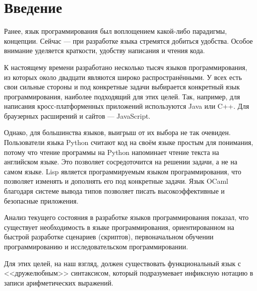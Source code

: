 \section*{Введение}
    Ранее, язык программирования был воплощением какой-либо парадигмы, концепции.
    Сейчас --- при разработке языка стремятся добиться удобства.
    Особое внимание уделяется краткости, удобству написания и чтения кода.

    К настоящему времени разработано несколько тысяч языков программирования, из которых около двадцати являются широко распространёнными\cite{TIOBE}.
    У всех есть свои сильные стороны и под конкретные задачи выбирается конкретный язык программирования, наиболее подходящий для этих целей.
    Так, например, для написания кросс-платформенных приложений используются Java или C++\cite{p_c_lisp}.
    Для браузерных расширений и сайтов --- JavaScript.

    Однако, для большинства языков, выигрыш от их выбора не так очевиден.
    Пользователи языка Python считают код на своём языке простым для понимания, потому что чтение программы на Python напоминает чтение текста на английском языке.
    Это позволяет сосредоточится на решении задачи, а не на самом языке.
    Lisp является программируемым языком программирования, что позволяет изменять и дополнять его под конкретные задачи.
    Язык OCaml благодаря системе вывода типов позволяет писать высокоэффективные и безопасные приложения.

    Анализ текущего состояния в разработке языков программирования показал, что существует необходимость в языке программирования, ориентированном на быстрой разработке сценариев (скриптов), первоначальном обучении программированию и исследовательском программировании.

    Для этих целей, на наш взгляд, должен существовать функциональный язык с <<дружелюбным>> синтаксисом, который подразумевает инфиксную нотацию в записи арифметических выражений.
